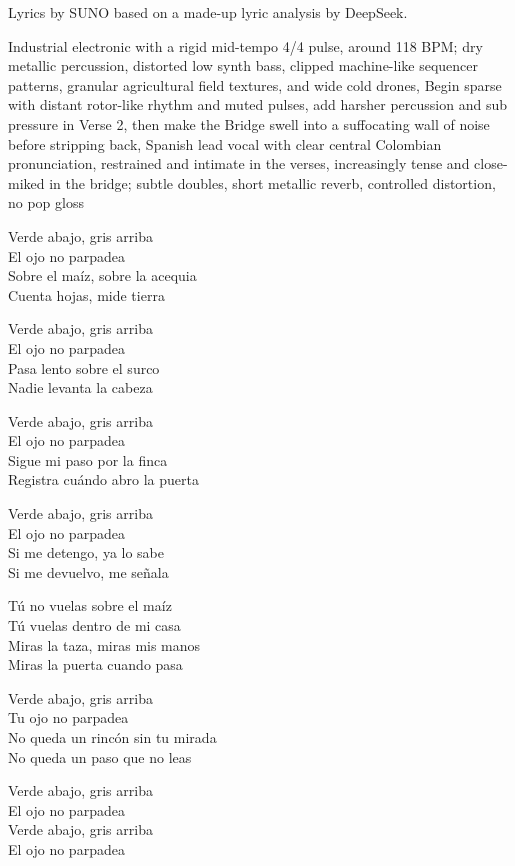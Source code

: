 
\begin{notes}
Lyrics by SUNO based on a made-up lyric analysis by DeepSeek.
\end{notes}
\begin{style}
Industrial electronic with a rigid mid-tempo 4/4 pulse, around 118 BPM; dry metallic percussion, distorted low synth bass, clipped machine-like sequencer patterns, granular agricultural field textures, and wide cold drones, Begin sparse with distant rotor-like rhythm and muted pulses, add harsher percussion and sub pressure in Verse 2, then make the Bridge swell into a suffocating wall of noise before stripping back, Spanish lead vocal with clear central Colombian pronunciation, restrained and intimate in the verses, increasingly tense and close-miked in the bridge; subtle doubles, short metallic reverb, controlled distortion, no pop gloss
\end{style}
\begin{lyrics}
Verde abajo, gris arriba\\
El ojo no parpadea\\
Sobre el maíz, sobre la acequia\\
Cuenta hojas, mide tierra

Verde abajo, gris arriba\\
El ojo no parpadea\\
Pasa lento sobre el surco\\
Nadie levanta la cabeza

Verde abajo, gris arriba\\
El ojo no parpadea\\
Sigue mi paso por la finca\\
Registra cuándo abro la puerta

Verde abajo, gris arriba\\
El ojo no parpadea\\
Si me detengo, ya lo sabe\\
Si me devuelvo, me señala

Tú no vuelas sobre el maíz\\
Tú vuelas dentro de mi casa\\
Miras la taza, miras mis manos\\
Miras la puerta cuando pasa

Verde abajo, gris arriba\\
Tu ojo no parpadea\\
No queda un rincón sin tu mirada\\
No queda un paso que no leas

Verde abajo, gris arriba\\
El ojo no parpadea\\
Verde abajo, gris arriba\\
El ojo no parpadea
\end{lyrics}

